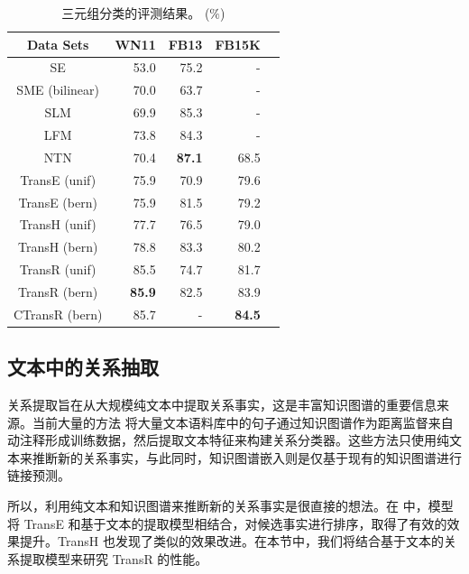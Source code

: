     \begin{table}[htb]
    \small
    \centering
    \caption{三元组分类的评测结果。 ($\%$)}
    \label{label_1:triple_classification}
    \begin{tabular}{|c|r|r|r|r|}
    \hline
    Data Sets & WN11 & FB13 & FB15K \\
    \hline
    SE                   & 53.0 &           75.2  & - \\
    SME (bilinear) & 70.0 &           63.7  & - \\
    SLM                & 69.9 &           85.3  & - \\
    LFM                & 73.8 &           84.3  & - \\
    NTN                & 70.4 &\textbf{87.1} &68.5 \\
    TransE (unif)  & 75.9 &           70.9  & 79.6 \\
    TransE (bern) & 75.9 &           81.5  & 79.2 \\
    TransH (unif)  & 77.7 &           76.5  & 79.0 \\
    TransH (bern) & 78.8 &           83.3  & 80.2 \\ \hline
    TransR (unif)  &85.5  &           74.7  & 81.7 \\
    TransR (bern) &\textbf{85.9}&82.5  & 83.9 \\
    CTransR (bern) & 85.7 & -&\textbf{84.5}\\
    \hline
    \end{tabular}
    \end{table}

    \subsection{文本中的关系抽取}

    关系提取旨在从大规模纯文本中提取关系事实，这是丰富知识图谱的重要信息来源。当前大量的方法 将大量文本语料库中的句子通过知识图谱作为距离监督来自动注释形成训练数据，然后提取文本特征来构建关系分类器。这些方法只使用纯文本来推断新的关系事实，与此同时，知识图谱嵌入则是仅基于现有的知识图谱进行链接预测。


    所以，利用纯文本和知识图谱来推断新的关系事实是很直接的想法。在  中，模型将 TransE 和基于文本的提取模型相结合，对候选事实进行排序，取得了有效的效果提升。TransH  也发现了类似的效果改进。在本节中，我们将结合基于文本的关系提取模型来研究 TransR 的性能。

